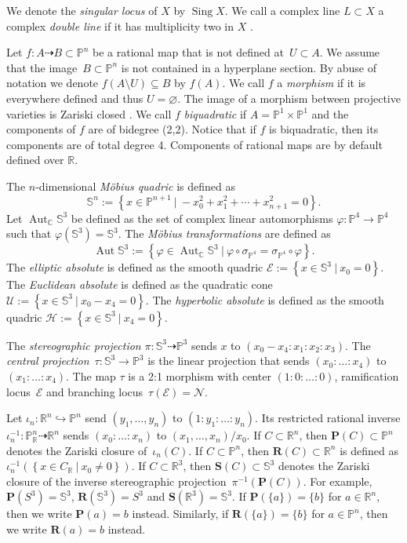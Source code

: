 \documentclass[11pt]{article}
\newcommand{\C}{\mathbb{C}}
\newcommand{\R}{\mathbb{R}}
\renewcommand{\P}{\mathbb{P}}
\renewcommand{\S}{\mathbb{S}}
\newcommand{\bP}{\mathbf{P}}
\newcommand{\bR}{\mathbf{R}}
\newcommand{\bS}{\mathbf{S}}
\newcommand{\cN}{\mathcal{N}}
\newcommand{\cE}{\mathcal{E}}
\newcommand{\cU}{\mathcal{U}}
\newcommand{\cH}{\mathcal{H}}
\renewcommand{\c}{\colon}
\newcommand{\dto}{\dasharrow}
\newcommand{\aut}{\operatorname{Aut}}
\newcommand{\set}[2]{\left\{#1 ~|~ #2\right\}}
\newcommand{\Sing}{\operatorname{Sing}}
\newcommand{\df}{\emph}
\newcommand{\st}{such that }
\begin{document}
We denote the \df{singular locus} of $X$ by $\Sing X$.
We call a complex line $L\subset X$
a complex \df{double line} if it has multiplicity two in $X$ \citep[page~388]{1977}.

Let $f\c A \dto B\subset\P^n$ be a rational map that is not defined at~$U\subset A$.
We assume that the image~$B\subset\P^n$ is not contained in a hyperplane section.
By abuse of notation we denote $f(A\setminus U)\subseteq B$ by $f(A)$.
We call $f$ a \df{morphism} if it is everywhere defined and thus $U=\varnothing$.
The image of a morphism between projective varieties is Zariski closed \cite[Theorem~II.4.9]{1977}.
We call $f$ \df{biquadratic} if $A=\P^1\times\P^1$ and the components
of $f$ are of bidegree (2,2). Notice that if $f$ is biquadratic, then
its components are of total degree 4.
Components of rational maps are by default defined over $\R$.

The $n$-dimensional \df{M\"obius quadric} is defined as
\[
\S^n:=\set{x\in\P^{n+1}}{-x_0^2+x_1^2+\cdots+x_{n+1}^2=0}.
\]
Let $\aut_\C\S^3$ be defined as the set of complex linear automorphisms
$\varphi\c\P^4\to\P^4$ \st $\varphi(\S^3)=\S^3$.
The \df{M\"obius transformations} are defined as
\[
\aut\S^3:=\set{\varphi\in\aut_\C\S^3}{\varphi\circ\sigma_{\P^4}=\sigma_{\P^4}\circ\varphi}.
\]
The \df{elliptic absolute} is
defined as the smooth quadric
$\cE:=\set{x\in \S^3}{ x_0=0}$.
The \df{Euclidean absolute} is defined as
the quadratic cone $\cU:=\set{x\in \S^3}{x_0-x_4=0}$.
The \df{hyperbolic absolute} is defined as
the smooth quadric $\cH:=\set{x\in \S^3}{x_4=0}$.

The \df{stereographic projection} $\pi\c\S^3\dto\P^3$ sends $x$ to $(x_0-x_4:x_1:x_2:x_3)$.
The \df{central projection}~$\tau\c \S^3\to \P^3$
is the linear projection that sends $(x_0:\ldots:x_4)$
to $(x_1:\ldots:x_4)$. The map $\tau$ is a 2:1 morphism with center $(1:0:\ldots:0)$, ramification locus~$\cE$
and branching locus~$\tau(\cE)=\cN$.

Let $\iota_n\c \R^n\hookrightarrow \P^n$ send $(y_1,\ldots,y_n)$ to $(1:y_1:\ldots:y_n)$.
Its restricted rational inverse $\iota_n^{-1}\c\P_\R^n\dto\R^n$ sends
$(x_0:\ldots:x_n)$ to $(x_1,\ldots,x_n)/x_0$.
If $C\subset\R^n$, then $\bP(C)\subset\P^n$ denotes the Zariski closure of~$\iota_n(C)$.
If $C\subset\P^n$, then $\bR(C)\subset\R^n$ is defined as $\iota_n^{-1}(\set{x\in C_\R}{x_0\neq 0})$.
If $C\subset\R^3$, then $\bS(C)\subset\S^3$ denotes the Zariski closure of
the inverse stereographic projection~$\pi^{-1}(\bP(C))$.
For example, $\bP(S^3)=\S^3$, $\bR(\S^3)=S^3$ and $\bS(\R^3)=\S^3$.
If $\bP(\{a\})=\{b\}$ for $a\in\R^n$, then we write $\bP(a)=b$ instead.
Similarly, if $\bR(\{a\})=\{b\}$ for $a\in\P^n$, then we write $\bR(a)=b$ instead.
\end{document}

